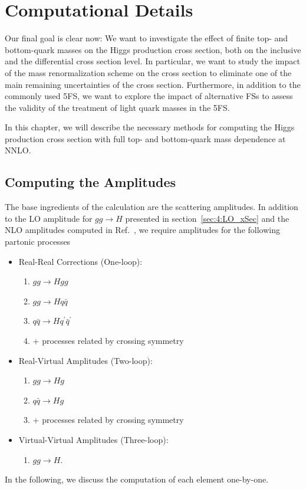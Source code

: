 
\chapter{Computational Details}\label{chap:5:computational_details}

Our final goal is clear now: We want to investigate the effect of finite top- and bottom-quark masses on the Higgs production cross section, both on the inclusive and the differential cross section level. In particular, we want to study the impact of the mass renormalization scheme on the cross section to eliminate one of the main remaining uncertainties of the cross section. Furthermore, in addition to the commonly used 5\acs{FS}, we want to explore the impact of alternative \acs{FS}s to assess the validity of the treatment of light quark masses in the 5\acs{FS}.

In this chapter, we will describe the necessary methods for computing the Higgs production cross section with full top- and bottom-quark mass dependence at \acs{NNLO}.

\section{Computing the Amplitudes}
The base ingredients of the calculation are the scattering amplitudes. In addition to the \acs{LO} amplitude for $gg \rightarrow H$ presented in section~\ref{sec:4:LO_xSec} and the \acs{NLO} amplitudes computed in Ref.~\cite{Graudenz:1992pv}, we require amplitudes for the following partonic processes
\begin{itemize}
  \item Real-Real Corrections (One-loop):
  \begin{enumerate}
    \item $gg \rightarrow H gg$
    \item $gg \rightarrow H q \bar{q}$
    \item $q\bar{q} \rightarrow H q^\prime \bar{q}^\prime$
    \item + processes related by crossing symmetry
  \end{enumerate}
  \item Real-Virtual Amplitudes (Two-loop):
  \begin{enumerate}
    \item $gg \rightarrow Hg$
    \item $q \bar{q} \rightarrow H g$
    \item + processes related by crossing symmetry
  \end{enumerate}
  \item Virtual-Virtual Amplitudes (Three-loop):
  \begin{enumerate}
    \item $g g \rightarrow H$.
  \end{enumerate}
\end{itemize}
In the following, we discuss the computation of each element one-by-one.

